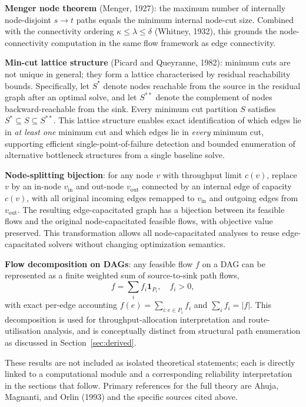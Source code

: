 \documentclass[12pt]{report}
\begin{document}
\textbf{Menger node theorem} (Menger, 1927): the maximum number of internally node-disjoint $s\to t$ paths equals the minimum internal node-cut size. Combined with the connectivity ordering $\kappa\le\lambda\le\delta$ (Whitney, 1932), this grounds the node-connectivity computation in the same flow framework as edge connectivity.

\textbf{Min-cut lattice structure} (Picard and Queyranne, 1982): minimum cuts are not unique in general; they form a lattice characterised by residual reachability bounds. Specifically, let $S^*$ denote nodes reachable from the source in the residual graph after an optimal solve, and let $S^{**}$ denote the complement of nodes backward-reachable from the sink. Every minimum cut partition $S$ satisfies $S^*\subseteq S\subseteq S^{**}$. This lattice structure enables exact identification of which edges lie in \emph{at least one} minimum cut and which edges lie in \emph{every} minimum cut, supporting efficient single-point-of-failure detection and bounded enumeration of alternative bottleneck structures from a single baseline solve.

\textbf{Node-splitting bijection}: for any node $v$ with throughput limit $c(v)$, replace $v$ by an in-node $v_{\mathrm{in}}$ and out-node $v_{\mathrm{out}}$ connected by an internal edge of capacity $c(v)$, with all original incoming edges remapped to $v_{\mathrm{in}}$ and outgoing edges from $v_{\mathrm{out}}$. The resulting edge-capacitated graph has a bijection between its feasible flows and the original node-capacitated feasible flows, with objective value preserved. This transformation allows all node-capacitated analyses to reuse edge-capacitated solvers without changing optimization semantics.

\textbf{Flow decomposition on DAGs}: any feasible flow $f$ on a DAG can be represented as a finite weighted sum of source-to-sink path flows,
\[
f = \sum_i f_i \mathbf{1}_{P_i}, \quad f_i > 0,
\]
with exact per-edge accounting $f(e)=\sum_{i: e\in P_i} f_i$ and $\sum_i f_i = |f|$. This decomposition is used for throughput-allocation interpretation and route-utilisation analysis, and is conceptually distinct from structural path enumeration as discussed in Section~\ref{sec:derived}.

These results are not included as isolated theoretical statements; each is directly linked to a computational module and a corresponding reliability interpretation in the sections that follow. Primary references for the full theory are Ahuja, Magnanti, and Orlin (1993) and the specific sources cited above.
\end{document}
